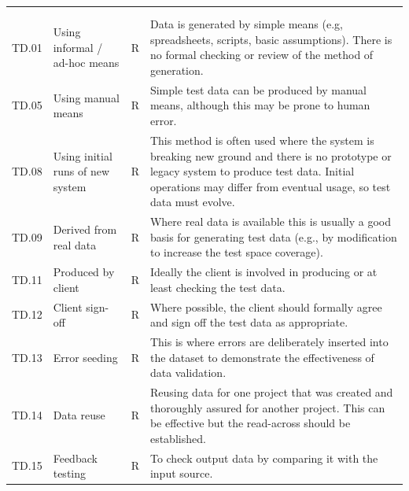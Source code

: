 \addtocounter{table}{-1} %
\begin{longtable*}{|C{}|L{}|C{}|L{}|}
  \\\hline{} &  &  & \\\hline
  \endfirsthead
  \\\hline{} &  &  & \\\hline
  \endhead
  \endfoot\endlastfoot
   TD.01 & Using informal / ad-hoc means & R & Data is generated by simple means (e.g, spreadsheets, scripts, basic assumptions). There is no formal checking or review of the method of generation.\\
  \hline
   TD.05 & Using manual means & R & Simple test data can be produced by manual means, although this may be prone to human error.\\
  \hline
   TD.08 & Using initial runs of new system & R & This method is often used where the system is breaking new ground and there is no prototype or legacy system to produce test data. Initial operations may differ from eventual usage, so test data must evolve.\\
  \hline
   TD.09 & Derived from real data & R & Where real data is available this is usually a good basis for generating test data (e.g., by modification to increase the test space coverage).\\
  \hline
   TD.11 & Produced by client & R & Ideally the client is involved in producing or at least checking the test data.\\
  \hline
   TD.12 & Client sign-off & R & Where possible, the client should formally agree and sign off the test data as appropriate.\\
  \hline
   TD.13 & Error seeding & R & This is where errors are deliberately inserted into the \gls{dataset} to demonstrate the effectiveness of data \gls{validation}.\\
  \hline
   TD.14 & Data reuse & R & Reusing data for one project that was created and thoroughly assured for another project. This can be effective but the read-across should be established.\\
  \hline
   TD.15 & Feedback testing & R & To check output data by comparing it with the input source.\\
  \hline
\end{longtable*}

